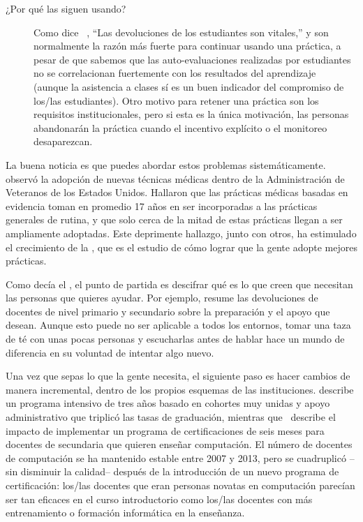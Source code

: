 \begin{description}
\item[¿Por qué las siguen usando?]

Como dice ~\cite{Bark2015}, ``Las devoluciones de los estudiantes son vitales,''
y son normalmente la razón más fuerte para continuar usando una práctica,
a pesar de que sabemos que las auto-evaluaciones realizadas por estudiantes 
no se correlacionan fuertemente con los resultados del aprendizaje~\cite{Star2014,Uttl2017}
(aunque la asistencia a clases sí es un buen indicador del compromiso de los/las estudiantes).
Otro motivo para retener una práctica son los requisitos institucionales,
pero si esta es la única motivación,
las personas abandonarán la práctica 
cuando el incentivo explícito o el monitoreo desaparezcan.

\end{description}

La buena noticia es que puedes abordar estos problemas sistemáticamente.
\cite{Baue2015} observó  la adopción de nuevas técnicas médicas dentro de la Administración de Veteranos de los Estados Unidos. 
Hallaron que las prácticas médicas basadas en evidencia
toman en promedio 17 años en ser incorporadas a las prácticas generales de rutina,
y que solo cerca de la mitad de estas prácticas llegan a ser ampliamente adoptadas.
Este deprimente hallazgo, junto con otros, ha estimulado el crecimiento de la
,
que es el estudio de cómo lograr que la gente adopte mejores prácticas.

Como decía el ,
el punto de partida es descifrar qué es lo que creen que necesitan las personas que quieres ayudar.
Por ejemplo, \cite{Yada2016} resume las devoluciones de docentes de nivel primario y secundario sobre la preparación y el apoyo que desean.
Aunque esto puede no ser aplicable a todos los entornos,
tomar una taza de té con unas pocas personas y escucharlas antes de hablar
hace un mundo de diferencia en su voluntad de intentar algo nuevo. 

Una vez que sepas lo que la gente necesita,
el siguiente paso es hacer cambios de manera incremental,
dentro de los propios esquemas de las instituciones.
\cite{Nara2018} describe un programa intensivo de tres años
basado en cohortes muy unidas y apoyo administrativo
que triplicó las tasas de graduación,
mientras que~\cite{Hu2017} describe el impacto de implementar un programa de certificaciones de seis meses para docentes de secundaria que quieren enseñar computación.
El número de docentes de computación se ha mantenido estable entre 2007 y 2013,
pero se cuadruplicó --sin disminuir la calidad-- después de la introducción de un nuevo programa de certificación:
los/las docentes que eran personas novatas en computación parecían ser tan eficaces en el curso introductorio como los/las docentes con más entrenamiento o formación informática en la enseñanza.

